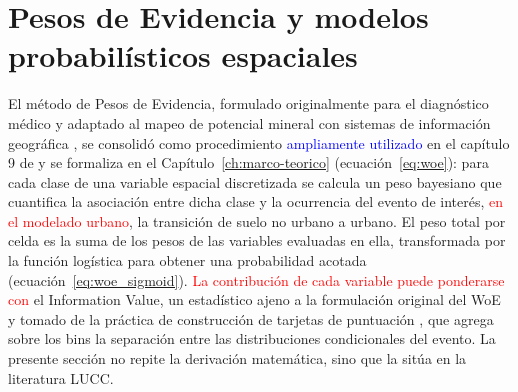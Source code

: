 
%


\section{Pesos de Evidencia y modelos probabilísticos espaciales}
\label{sec:woe-literatura}

El método de Pesos de Evidencia, formulado originalmente para el diagnóstico
médico y adaptado al mapeo de potencial mineral con sistemas de información
geográfica \parencite{BonhamCarter1989}, se consolidó como procedimiento
\textcolor{blue}{ampliamente utilizado} en el capítulo 9 de
\textcite{BonhamCarter1994} y se formaliza en el
Capítulo~\ref{ch:marco-teorico} (ecuación~\ref{eq:woe}): para cada clase de
una variable espacial discretizada se calcula un peso bayesiano que cuantifica
la asociación entre dicha clase y la ocurrencia del evento de interés,
\textcolor{red}{en el modelado urbano}, la transición de suelo no urbano a urbano. El peso total por celda es
la suma de los pesos de las variables evaluadas en ella, transformada por la
función logística para obtener una probabilidad acotada
(ecuación~\ref{eq:woe_sigmoid}). \textcolor{red}{La contribución de cada
variable puede ponderarse con} el Information Value, un estadístico ajeno a la formulación
original del WoE y tomado de la práctica de construcción de tarjetas de
puntuación \parencite{Siddiqi2006}, que agrega sobre los bins la separación
entre las distribuciones condicionales del evento. La presente
sección no repite la derivación matemática, sino que la sitúa en la literatura
LUCC.



